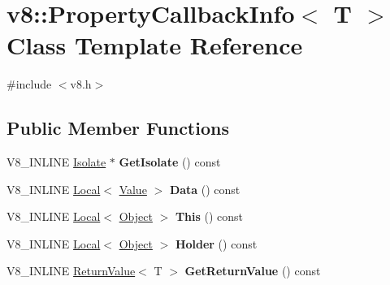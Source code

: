\hypertarget{classv8_1_1_property_callback_info}{}\section{v8\+:\+:Property\+Callback\+Info$<$ T $>$ Class Template Reference}
\label{classv8_1_1_property_callback_info}


{\ttfamily \#include $<$v8.\+h$>$}

\subsection*{Public Member Functions}
\begin{DoxyCompactItemize}
\item 
\hypertarget{classv8_1_1_property_callback_info_a066d0c9eee98f80fb78d97961eafa8ad}{}V8\+\_\+\+I\+N\+L\+I\+N\+E \hyperlink{classv8_1_1_isolate}{Isolate} $\ast$ {\bfseries Get\+Isolate} () const \label{classv8_1_1_property_callback_info_a066d0c9eee98f80fb78d97961eafa8ad}

\item 
\hypertarget{classv8_1_1_property_callback_info_a64edbaeb902e360fc2a4d353c8c4930f}{}V8\+\_\+\+I\+N\+L\+I\+N\+E \hyperlink{classv8_1_1_local}{Local}$<$ \hyperlink{classv8_1_1_value}{Value} $>$ {\bfseries Data} () const \label{classv8_1_1_property_callback_info_a64edbaeb902e360fc2a4d353c8c4930f}

\item 
\hypertarget{classv8_1_1_property_callback_info_a747202a7d4db0b930f19f9466c3a5acb}{}V8\+\_\+\+I\+N\+L\+I\+N\+E \hyperlink{classv8_1_1_local}{Local}$<$ \hyperlink{classv8_1_1_object}{Object} $>$ {\bfseries This} () const \label{classv8_1_1_property_callback_info_a747202a7d4db0b930f19f9466c3a5acb}

\item 
\hypertarget{classv8_1_1_property_callback_info_a8eb97205ce7bd25b446b03643d02570d}{}V8\+\_\+\+I\+N\+L\+I\+N\+E \hyperlink{classv8_1_1_local}{Local}$<$ \hyperlink{classv8_1_1_object}{Object} $>$ {\bfseries Holder} () const \label{classv8_1_1_property_callback_info_a8eb97205ce7bd25b446b03643d02570d}

\item 
\hypertarget{classv8_1_1_property_callback_info_a4e9bc4da66ed3ea21aac7dbb9c11465b}{}V8\+\_\+\+I\+N\+L\+I\+N\+E \hyperlink{classv8_1_1_return_value}{Return\+Value}$<$ T $>$ {\bfseries Get\+Return\+Value} () const \label{classv8_1_1_property_callback_info_a4e9bc4da66ed3ea21aac7dbb9c11465b}

\end{DoxyCompactItemize}
